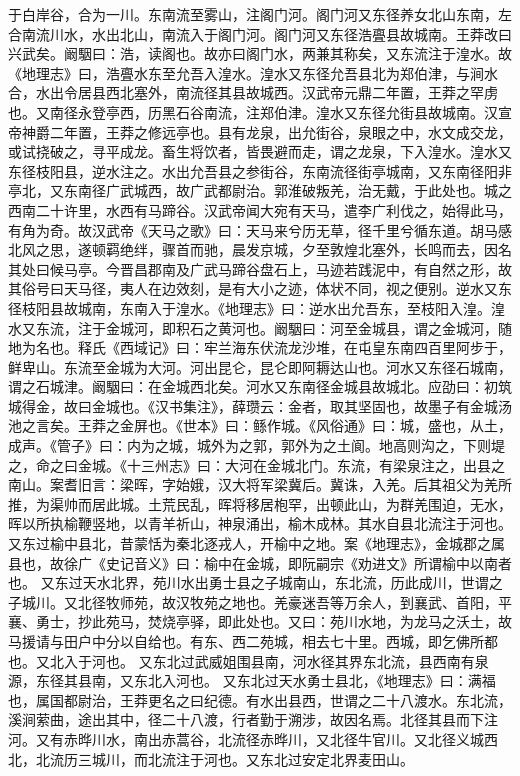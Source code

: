 \documentclass[12pt,UTF8]{ctexbook}
\begin{document}
于白岸谷，合为一川。东南流至雾山，注阁门河。阁门河又东径养女北山东南，左合南流川水，水出北山，南流入于阁门河。阁门河又东径浩亹县故城南。王莽改曰兴武矣。阚駰曰：浩，读阁也。故亦曰阁门水，两兼其称矣，又东流注于湟水。故《地理志》曰，浩亹水东至允吾入湟水。湟水又东径允吾县北为郑伯津，与涧水合，水出令居县西北塞外，南流径其县故城西。汉武帝元鼎二年置，王莽之罕虏也。又南径永登亭西，历黑石谷南流，注郑伯津。湟水又东径允街县故城南。汉宣帝神爵二年置，王莽之修远亭也。县有龙泉，出允街谷，泉眼之中，水文成交龙，或试挠破之，寻平成龙。畜生将饮者，皆畏避而走，谓之龙泉，下入湟水。湟水又东径枝阳县，逆水注之。水出允吾县之参街谷，东南流径街亭城南，又东南径阳非亭北，又东南径广武城西，故广武都尉治。郭淮破叛羌，治无戴，于此处也。城之西南二十许里，水西有马蹄谷。汉武帝闻大宛有天马，遣李广利伐之，始得此马，有角为奇。故汉武帝《天马之歌》曰：天马来兮历无草，径千里兮循东道。胡马感北风之思，遂顿羁绝绊，骤首而驰，晨发京城，夕至敦煌北塞外，长鸣而去，因名其处曰候马亭。今晋昌郡南及广武马蹄谷盘石上，马迹若践泥中，有自然之形，故其俗号曰天马径，夷人在边效刻，是有大小之迹，体状不同，视之便别。逆水又东径枝阳县故城南，东南入于湟水。《地理志》曰：逆水出允吾东，至枝阳入湟。湟水又东流，注于金城河，即积石之黄河也。阚駰曰：河至金城县，谓之金城河，随地为名也。释氏《西域记》曰：牢兰海东伏流龙沙堆，在屯皇东南四百里阿步于，鲜卑山。东流至金城为大河。河出昆仑，昆仑即阿耨达山也。河水又东径石城南，谓之石城津。阚駰曰：在金城西北矣。河水又东南径金城县故城北。应劭曰：初筑城得金，故曰金城也。《汉书集注》，薛瓒云：金者，取其坚固也，故墨子有金城汤池之言矣。王莽之金屏也。《世本》曰：鲧作城。《风俗通》曰：城，盛也，从土，成声。《管子》曰：内为之城，城外为之郭，郭外为之土阆。地高则沟之，下则堤之，命之曰金城。《十三州志》曰：大河在金城北门。东流，有梁泉注之，出县之南山。案耆旧言：梁晖，字始娥，汉大将军梁冀后。冀诛，入羌。后其祖父为羌所推，为渠帅而居此城。土荒民乱，晖将移居枹罕，出顿此山，为群羌围迫，无水，晖以所执榆鞭竖地，以青羊祈山，神泉涌出，榆木成林。其水自县北流注于河也。又东过榆中县北，昔蒙恬为秦北逐戎人，开榆中之地。案《地理志》，金城郡之属县也，故徐广《史记音义》曰：榆中在金城，即阮嗣宗《劝进文》所谓榆中以南者也。
又东过天水北界，苑川水出勇士县之子城南山，东北流，历此成川，世谓之子城川。又北径牧师苑，故汉牧苑之地也。羌豪迷吾等万余人，到襄武、首阳，平襄、勇士，抄此苑马，焚烧亭驿，即此处也。又曰：苑川水地，为龙马之沃土，故马援请与田户中分以自给也。有东、西二苑城，相去七十里。西城，即乞佛所都也。又北入于河也。
又东北过武威姐围县南，河水径其界东北流，县西南有泉源，东径其县南，又东北入河也。
又东北过天水勇士县北，《地理志》曰：满福也，属国都尉治，王莽更名之曰纪德。有水出县西，世谓之二十八渡水。东北流，溪涧萦曲，途出其中，径二十八渡，行者勤于溯涉，故因名焉。北径其县而下注河。又有赤晔川水，南出赤蒿谷，北流径赤晔川，又北径牛官川。又北径义城西北，北流历三城川，而北流注于河也。又东北过安定北界麦田山。
\end{document}
